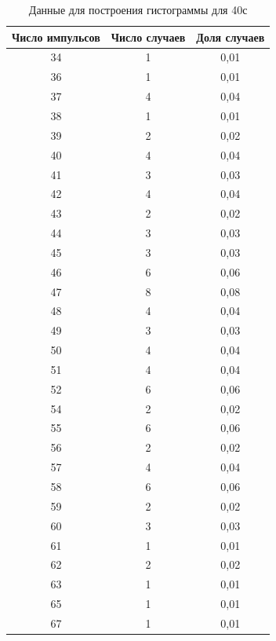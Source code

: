\documentclass{article}
\begin{document}
\begin{table}[!h]
    \centering
    \begin{tabular}{|c|c|c|}
        \hline
         Число импульсов & Число случаев & Доля случаев \\
         \hline
        34 & 1 & 0,01 \\
        36 & 1 & 0,01 \\
        37 & 4 & 0,04 \\
        38 & 1 & 0,01 \\
        39 & 2 & 0,02 \\
        40 & 4 & 0,04 \\
        41 & 3 & 0,03 \\
        42 & 4 & 0,04 \\
        43 & 2 & 0,02 \\
        44 & 3 & 0,03 \\
        45 & 3 & 0,03 \\
        46 & 6 & 0,06 \\
        47 & 8 & 0,08 \\
        48 & 4 & 0,04 \\
        49 & 3 & 0,03 \\
        50 & 4 & 0,04 \\
        51 & 4 & 0,04 \\
        52 & 6 & 0,06 \\
        54 & 2 & 0,02 \\
        55 & 6 & 0,06 \\
        56 & 2 & 0,02 \\
        57 & 4 & 0,04 \\
        58 & 6 & 0,06 \\
        59 & 2 & 0,02 \\
        60 & 3 & 0,03 \\
        61 & 1 & 0,01 \\
        62 & 2 & 0,02 \\
        63 & 1 & 0,01 \\
        65 & 1 & 0,01 \\
        67 & 1 & 0,01 \\
        \hline
    \end{tabular}
    \caption{Данные для построения гистограммы для 40с}
\end{table}
\end{document}

